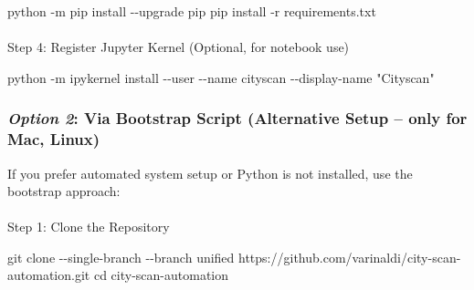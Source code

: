 \documentclass[
  letterpaper,
  DIV=11,
  numbers=noendperiod]{scrreprt}
\makeatletter
\let\oldparagraph\paragraph
\renewcommand{\paragraph}{
    \@ifstar
      \xxxParagraphStar
      \xxxParagraphNoStar
  }
\newcommand{\xxxParagraphStar}[1]{\oldparagraph*{#1}\mbox{}}
\newcommand{\xxxParagraphNoStar}[1]{\oldparagraph{#1}\mbox{}}
\newenvironment{Shaded}{\begin{snugshade}}{\end{snugshade}}
\newcommand{\AttributeTok}[1]{\textcolor[rgb]{0.40,0.45,0.13}{#1}}
\newcommand{\BuiltInTok}[1]{\textcolor[rgb]{0.00,0.23,0.31}{#1}}
\newcommand{\ExtensionTok}[1]{\textcolor[rgb]{0.00,0.23,0.31}{#1}}
\newcommand{\FunctionTok}[1]{\textcolor[rgb]{0.28,0.35,0.67}{#1}}
\newcommand{\NormalTok}[1]{\textcolor[rgb]{0.00,0.23,0.31}{#1}}
\newcommand{\StringTok}[1]{\textcolor[rgb]{0.13,0.47,0.30}{#1}}
\makeatother
\begin{document}
\begin{Shaded}
\begin{Highlighting}[]
\ExtensionTok{python} \AttributeTok{{-}m}\NormalTok{ pip install }\AttributeTok{{-}{-}upgrade}\NormalTok{ pip}
\ExtensionTok{pip}\NormalTok{ install }\AttributeTok{{-}r}\NormalTok{ requirements.txt}
\end{Highlighting}
\end{Shaded}

\paragraph{Step 4: Register Jupyter Kernel (Optional, for notebook
use)}\label{step-4-register-jupyter-kernel-optional-for-notebook-use}

\begin{Shaded}
\begin{Highlighting}[]
\ExtensionTok{python} \AttributeTok{{-}m}\NormalTok{ ipykernel install }\AttributeTok{{-}{-}user} \AttributeTok{{-}{-}name}\NormalTok{ cityscan }\AttributeTok{{-}{-}display{-}name} \StringTok{"Cityscan"}
\end{Highlighting}
\end{Shaded}

\subsubsection{\texorpdfstring{\emph{Option 2}: Via Bootstrap Script
(Alternative Setup -- only for Mac,
Linux)}{Option 2: Via Bootstrap Script (Alternative Setup -- only for Mac, Linux)}}\label{option-2-via-bootstrap-script-alternative-setup-only-for-mac-linux}

If you prefer automated system setup or Python is not installed, use the
bootstrap approach:

\paragraph{Step 1: Clone the
Repository}\label{step-1-clone-the-repository}

\begin{Shaded}
\begin{Highlighting}[]
\FunctionTok{git}\NormalTok{ clone }\AttributeTok{{-}{-}single{-}branch} \AttributeTok{{-}{-}branch}\NormalTok{ unified https://github.com/varinaldi/city{-}scan{-}automation.git}
\BuiltInTok{cd}\NormalTok{ city{-}scan{-}automation}
\end{Highlighting}
\end{Shaded}
\end{document}
